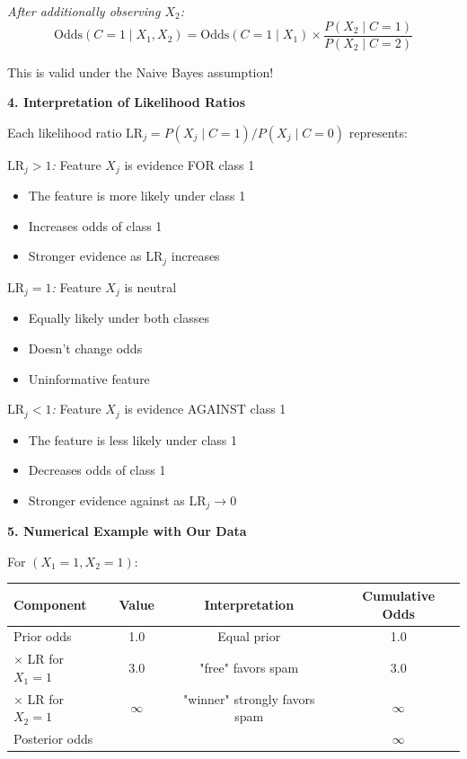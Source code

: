 \documentclass[12pt]{article}
\begin{document}
\begin{explanation}
\textit{After additionally observing $X_2$:}
\[
\text{Odds}(C=1 \mid X_1, X_2) = \text{Odds}(C=1 \mid X_1) \times \frac{P(X_2 \mid C=1)}{P(X_2 \mid C=2)}
\]

This is valid under the Naive Bayes assumption!

\textbf{4. Interpretation of Likelihood Ratios}

Each likelihood ratio $\text{LR}_j = P(X_j \mid C=1)/P(X_j \mid C=0)$ represents:

\textit{$\text{LR}_j > 1$:} Feature $X_j$ is evidence FOR class 1
\begin{itemize}
    \item The feature is more likely under class 1
    \item Increases odds of class 1
    \item Stronger evidence as $\text{LR}_j$ increases
\end{itemize}

\textit{$\text{LR}_j = 1$:} Feature $X_j$ is neutral
\begin{itemize}
    \item Equally likely under both classes
    \item Doesn't change odds
    \item Uninformative feature
\end{itemize}

\textit{$\text{LR}_j < 1$:} Feature $X_j$ is evidence AGAINST class 1
\begin{itemize}
    \item The feature is less likely under class 1
    \item Decreases odds of class 1
    \item Stronger evidence against as $\text{LR}_j \to 0$
\end{itemize}

\textbf{5. Numerical Example with Our Data}

For $(X_1=1, X_2=1)$:

\begin{center}
\begin{tabular}{|l|c|c|c|}
\hline
\textbf{Component} & \textbf{Value} & \textbf{Interpretation} & \textbf{Cumulative Odds} \\
\hline
Prior odds & 1.0 & Equal prior & 1.0 \\
$\times$ LR for $X_1=1$ & 3.0 & "free" favors spam & 3.0 \\
$\times$ LR for $X_2=1$ & $\infty$ & "winner" strongly favors spam & $\infty$ \\
\hline
Posterior odds &  &  & $\infty$ \\
\hline
\end{tabular}
\end{center}


\end{explanation}
\end{document}
